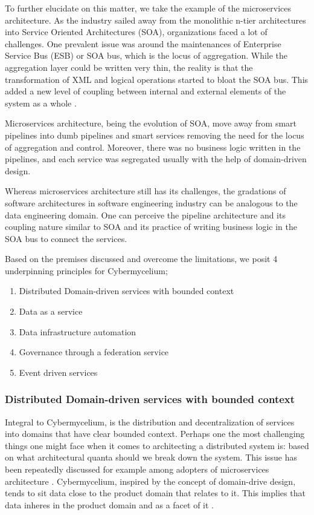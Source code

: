 \documentclass[review]{elsarticle}
\begin{document}
To further elucidate on this matter, we take the example of the microservices architecture. As the industry sailed away from the monolithic n-tier architectures into Service Oriented Architectures (SOA), organizations faced a lot of challenges. One prevalent issue was around the maintenances of Enterprise Service Bus (ESB) or SOA bus, which is the locus of aggregation. While the aggregation layer could be written very thin, the reality is that the transformation of XML and logical operations started to bloat the SOA bus. This added a new level of coupling between internal and external elements of the system as a whole \cite{di2017architecting,zimmermann2017microservices,waseem2020systematic}.

Microservices architecture, being the evolution of SOA, move away from smart pipelines into dumb pipelines and smart services removing the need for the locus of aggregation and control. Moreover, there was no business logic written in the pipelines, and each service was segregated usually with the help of domain-driven design.

Whereas microservices architecture still has its challenges, the gradations of software architectures in software engineering industry can be analogous to the data engineering domain. One can perceive the pipeline architecture and its coupling nature similar to SOA and its practice of writing business logic in the SOA bus to connect the services. 

Based on the premises discussed and overcome the limitations, we posit 4 underpinning principles for Cybermycelium;

\begin{enumerate}
    \item Distributed Domain-driven services with bounded context
    \item Data as a service
    \item Data infrastructure automation
    \item Governance through a federation service
    \item Event driven services
\end{enumerate}

\subsubsection{Distributed Domain-driven services with bounded context}

Integral to Cybermycelium, is the distribution and decentralization of services into domains that have clear bounded context. Perhaps one the most challenging things one might face when it comes to architecting a distributed system is: based on what architectural quanta should we break down the system. This issue has been repeatedly discussed for example among adopters of microservices architecture . Cybermycelium, inspired by the concept of domain-drive design, tends to sit data close to the product domain that relates to it. This implies that data inheres in the product domain and as a facet of it \cite{laigner2021data}.
\end{document}
